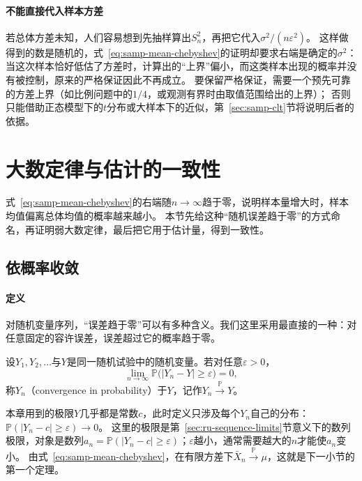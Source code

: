 \paragraph{不能直接代入样本方差}
若总体方差未知，人们容易想到先抽样算出$S_n^2$，再把它代入$\sigma^2/(n\varepsilon^2)$。
这样做得到的数是随机的，式~\eqref{eq:samp-mean-chebyshev}的证明却要求右端是确定的$\sigma^2$：
当这次样本恰好低估了方差时，计算出的“上界”偏小，而这类样本出现的概率并没有被控制，原来的严格保证因此不再成立。
要保留严格保证，需要一个预先可靠的方差上界（如比例问题中的$1/4$，或观测有界时由取值范围给出的上界）；
否则只能借助正态模型下的$t$分布或大样本下的近似，第~\ref{sec:samp-clt}节将说明后者的依据。

\section{大数定律与估计的一致性}
\label{sec:samp-lln}

式~\eqref{eq:samp-mean-chebyshev}的右端随$n\to\infty$趋于零，说明样本量增大时，样本均值偏离总体均值的概率越来越小。
本节先给这种“随机误差趋于零”的方式命名，再证明弱大数定律，最后把它用于估计量，得到一致性。

\subsection{依概率收敛}

\paragraph{定义}
对随机变量序列，“误差趋于零”可以有多种含义。我们这里采用最直接的一种：对任意固定的容许误差，误差超过它的概率趋于零。

\begin{definition}[依概率收敛]
\label{def:samp-convergence-in-probability}
设$Y_1,Y_2,\dots$与$Y$是同一随机试验中的随机变量。若对任意$\varepsilon>0$，
\[
  \lim_{n\to\infty}\mathbb{P}\bigl(|Y_n-Y|\geq\varepsilon\bigr)=0,
\]
称$Y_n$（convergence in probability）于$Y$，记作$Y_n\xrightarrow{\mathbb{P}}Y$。
\end{definition}

本章用到的极限$Y$几乎都是常数$c$，此时定义只涉及每个$Y_n$自己的分布：$\mathbb{P}(|Y_n-c|\geq\varepsilon)\to0$。
这里的极限是第~\ref{sec:ru-sequence-limits}节意义下的数列极限，对象是数列$a_n=\mathbb{P}(|Y_n-c|\geq\varepsilon)$；$\varepsilon$越小，通常需要越大的$n$才能使$a_n$变小。
由式~\eqref{eq:samp-mean-chebyshev}，在有限方差下$\bar X_n\xrightarrow{\mathbb{P}}\mu$，这就是下一小节的第一个定理。

